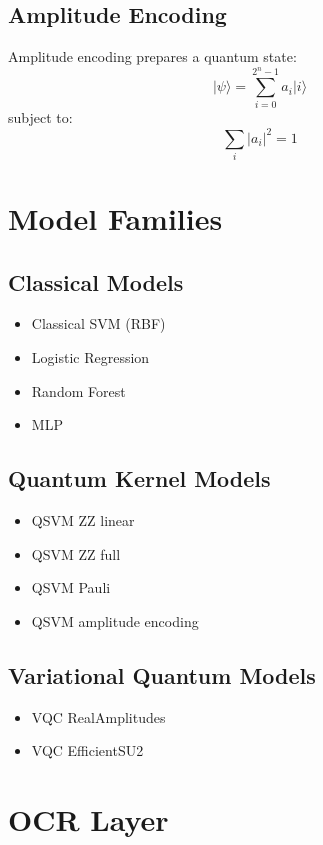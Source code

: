 \documentclass[12pt,a4paper]{article}
\begin{document}
\subsection{Amplitude Encoding}

Amplitude encoding prepares a quantum state:
\[
\lvert \psi \rangle = \sum_{i=0}^{2^n - 1} a_i \lvert i \rangle
\]
subject to:
\[
\sum_i |a_i|^2 = 1
\]

\section{Model Families}

\subsection{Classical Models}

\begin{itemize}
  \item Classical SVM (RBF)
  \item Logistic Regression
  \item Random Forest
  \item MLP
\end{itemize}

\subsection{Quantum Kernel Models}

\begin{itemize}
  \item QSVM ZZ linear
  \item QSVM ZZ full
  \item QSVM Pauli
  \item QSVM amplitude encoding
\end{itemize}

\subsection{Variational Quantum Models}

\begin{itemize}
  \item VQC RealAmplitudes
  \item VQC EfficientSU2
\end{itemize}

\section{OCR Layer}
\end{document}

